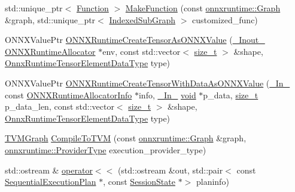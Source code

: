 \begin{DoxyCompactItemize}
\item 
std\+::unique\+\_\+ptr$<$ \mbox{\hyperlink{classonnxruntime_1_1Function}{Function}} $>$ \mbox{\hyperlink{namespaceonnxruntime_af5276c9c1bd921088c77a5cd371e67d7}{Make\+Function}} (const \mbox{\hyperlink{classonnxruntime_1_1Graph}{onnxruntime\+::\+Graph}} \&graph, std\+::unique\+\_\+ptr$<$ \mbox{\hyperlink{structonnxruntime_1_1IndexedSubGraph}{Indexed\+Sub\+Graph}} $>$ customized\+\_\+func)
\item 
O\+N\+N\+X\+Value\+Ptr \mbox{\hyperlink{namespaceonnxruntime_a2b7951372d06d39431033e6036bb06a9}{O\+N\+N\+X\+Runtime\+Create\+Tensor\+As\+O\+N\+N\+X\+Value}} (\mbox{\hyperlink{visibility__macros_8h_a198d136b8176ee5824b09c7bd8b7beb0}{\+\_\+\+Inout\+\_\+}} \mbox{\hyperlink{session_2allocator_8h_a9eb4a70849a17d41aca1955b07cdfaca}{O\+N\+N\+X\+Runtime\+Allocator}} $\ast$env, const std\+::vector$<$ \mbox{\hyperlink{mlasi_8h_a503efbc1c6e50825320ad909366b78ab}{size\+\_\+t}} $>$ \&shape, \mbox{\hyperlink{tensor__type__and__shape__c__api_8h_acc48f6a9c9e4d7071352e45ce13324b3}{Onnx\+Runtime\+Tensor\+Element\+Data\+Type}} type)
\item 
O\+N\+N\+X\+Value\+Ptr \mbox{\hyperlink{namespaceonnxruntime_a9ef7df1ce928bb454ae46bd4a0cad005}{O\+N\+N\+X\+Runtime\+Create\+Tensor\+With\+Data\+As\+O\+N\+N\+X\+Value}} (\mbox{\hyperlink{visibility__macros_8h_aa74f89aa7d942f4a79ea12d7c9b763ef}{\+\_\+\+In\+\_\+}} const \mbox{\hyperlink{structONNXRuntimeAllocatorInfo}{O\+N\+N\+X\+Runtime\+Allocator\+Info}} $\ast$info, \mbox{\hyperlink{visibility__macros_8h_aa74f89aa7d942f4a79ea12d7c9b763ef}{\+\_\+\+In\+\_\+}} \mbox{\hyperlink{mlasi_8h_a88f941d423cb2a819b70a1358982b1a6}{void}} $\ast$p\+\_\+data, \mbox{\hyperlink{mlasi_8h_a503efbc1c6e50825320ad909366b78ab}{size\+\_\+t}} p\+\_\+data\+\_\+len, const std\+::vector$<$ \mbox{\hyperlink{mlasi_8h_a503efbc1c6e50825320ad909366b78ab}{size\+\_\+t}} $>$ \&shape, \mbox{\hyperlink{tensor__type__and__shape__c__api_8h_acc48f6a9c9e4d7071352e45ce13324b3}{Onnx\+Runtime\+Tensor\+Element\+Data\+Type}} type)
\item 
\mbox{\hyperlink{structonnxruntime_1_1TVMGraph}{T\+V\+M\+Graph}} \mbox{\hyperlink{namespaceonnxruntime_a4b3dbf1759aa7c7299c88497c70c633a}{Compile\+To\+T\+VM}} (const \mbox{\hyperlink{classonnxruntime_1_1Graph}{onnxruntime\+::\+Graph}} \&graph, \mbox{\hyperlink{namespaceonnxruntime_a863e2227cbf32aab76aad35fdadff4bb}{onnxruntime\+::\+Provider\+Type}} execution\+\_\+provider\+\_\+type)
\item 
std\+::ostream \& \mbox{\hyperlink{namespaceonnxruntime_a310735a2d99a62a07608f3cc75b53f2a}{operator$<$$<$}} (std\+::ostream \&out, std\+::pair$<$ const \mbox{\hyperlink{structonnxruntime_1_1SequentialExecutionPlan}{Sequential\+Execution\+Plan}} $\ast$, const \mbox{\hyperlink{classonnxruntime_1_1SessionState}{Session\+State}} $\ast$$>$ planinfo)
$$
\end{DoxyCompactItemize}
